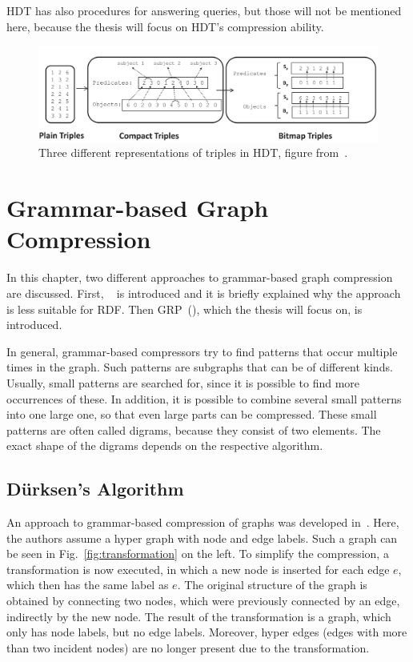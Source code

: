 HDT has also procedures for answering queries, but those will not be mentioned here, because the thesis will focus on HDT's compression ability.




\begin{figure}[h]
	\centering
	\includegraphics[width=1\textwidth]{figures/relatedwork/hdt1}
	\caption{Three different representations of triples in HDT, figure from~\cite{hdt}.}
	\label{fig:hdt_overview}
\end{figure}


\section{Grammar-based Graph Compression}\label{related_work_grammar_based}

In this chapter, two different approaches to grammar-based graph compression are discussed. First, ~\cite{mattdk} is introduced and it is briefly explained why the approach is less suitable for RDF. Then GRP~(\cite{maneth}), which the thesis will focus on, is introduced.

In general, grammar-based compressors try to find patterns that occur multiple times in the graph. Such patterns are subgraphs that can be of different kinds. Usually, small patterns are searched for, since it is possible to find more occurrences of these. In addition, it is possible to combine several small patterns into one large one, so that even large parts can be compressed. These small patterns are often called digrams, because they consist of two elements. The exact shape of the digrams depends on the respective algorithm.

\clearpage
\subsection{Dürksen's Algorithm}

An approach to grammar-based compression of graphs was developed in~\cite{mattdk}. Here, the authors assume a hyper graph with node and edge labels. Such a graph can be seen in Fig.~\ref{fig:transformation} on the left. To simplify the compression, a transformation is now executed, in which a new node is inserted for each edge $e$, which then has the same label as $e$. The original structure of the graph is obtained by connecting two nodes, which were previously connected by an edge, indirectly by the new node. The result of the transformation is a graph, which only has node labels, but no edge labels. Moreover, hyper edges (edges with more than two incident nodes) are no longer present due to the transformation.

